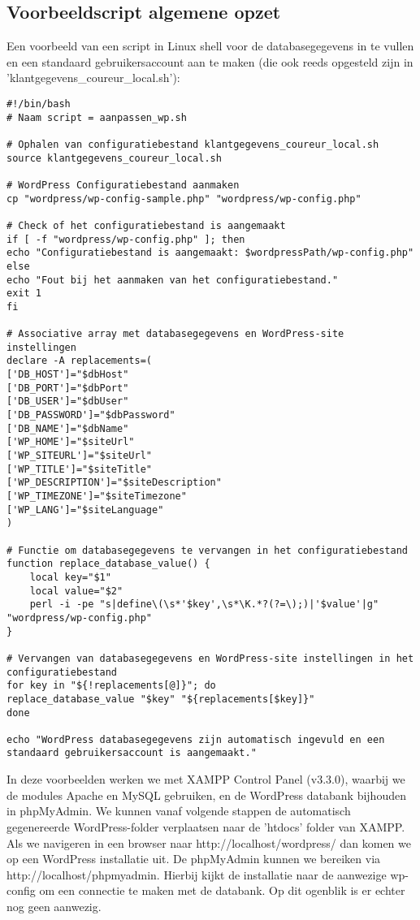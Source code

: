 \subsection{Voorbeeldscript algemene opzet}
Een voorbeeld van een script in Linux shell voor de databasegegevens in te vullen en een standaard gebruikersaccount aan te maken (die ook reeds opgesteld zijn in 'klantgegevens\_coureur\_local.sh'):
\begin{verbatim}
#!/bin/bash
# Naam script = aanpassen_wp.sh

# Ophalen van configuratiebestand klantgegevens_coureur_local.sh
source klantgegevens_coureur_local.sh

# WordPress Configuratiebestand aanmaken
cp "wordpress/wp-config-sample.php" "wordpress/wp-config.php"

# Check of het configuratiebestand is aangemaakt
if [ -f "wordpress/wp-config.php" ]; then
echo "Configuratiebestand is aangemaakt: $wordpressPath/wp-config.php"
else
echo "Fout bij het aanmaken van het configuratiebestand."
exit 1
fi

# Associative array met databasegegevens en WordPress-site instellingen
declare -A replacements=(
['DB_HOST']="$dbHost"
['DB_PORT']="$dbPort"
['DB_USER']="$dbUser"
['DB_PASSWORD']="$dbPassword"
['DB_NAME']="$dbName"
['WP_HOME']="$siteUrl"
['WP_SITEURL']="$siteUrl"
['WP_TITLE']="$siteTitle"
['WP_DESCRIPTION']="$siteDescription"
['WP_TIMEZONE']="$siteTimezone"
['WP_LANG']="$siteLanguage"
)

# Functie om databasegegevens te vervangen in het configuratiebestand
function replace_database_value() {
    local key="$1"
    local value="$2"
    perl -i -pe "s|define\(\s*'$key',\s*\K.*?(?=\);)|'$value'|g" "wordpress/wp-config.php"
}

# Vervangen van databasegegevens en WordPress-site instellingen in het configuratiebestand
for key in "${!replacements[@]}"; do
replace_database_value "$key" "${replacements[$key]}"
done

echo "WordPress databasegegevens zijn automatisch ingevuld en een standaard gebruikersaccount is aangemaakt."
\end{verbatim}
In deze voorbeelden werken we met XAMPP Control Panel (v3.3.0), waarbij we de modules Apache en MySQL gebruiken, en de WordPress databank bijhouden in phpMyAdmin. We kunnen vanaf volgende stappen de automatisch gegenereerde WordPress-folder verplaatsen naar de 'htdocs' folder van XAMPP. Als we navigeren in een browser naar http://localhost/wordpress/ dan komen we op een WordPress installatie uit. De phpMyAdmin kunnen we bereiken via http://localhost/phpmyadmin. Hierbij kijkt de installatie naar de aanwezige wp-config om een connectie te maken met de databank. Op dit ogenblik is er echter nog geen aanwezig.
